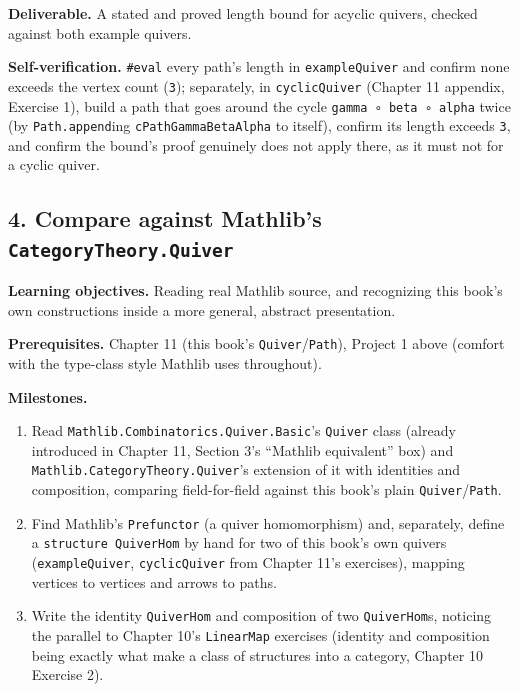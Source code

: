 \textbf{Deliverable.} A stated and proved length bound for acyclic quivers, checked against both example quivers.

\textbf{Self-verification.} \texttt{\#eval} every path's length in \texttt{exampleQuiver} and confirm none exceeds the vertex count (\texttt{3}); separately, in \texttt{cyclicQuiver} (Chapter 11 appendix, Exercise 1), build a path that goes around the cycle \texttt{gamma ∘ beta ∘ alpha} twice (by \texttt{Path.append}ing \texttt{cPathGammaBetaAlpha} to itself), confirm its length exceeds \texttt{3}, and confirm the bound's proof genuinely does not apply there, as it must not for a cyclic quiver.

\subsection{\texorpdfstring{4. Compare against Mathlib's \texttt{CategoryTheory.Quiver}}{4. Compare against Mathlib's CategoryTheory.Quiver}}\label{sec:13-next-steps:03-next-projects:5}

\textbf{Learning objectives.} Reading real Mathlib source, and recognizing this book's own constructions inside a more general, abstract presentation.

\textbf{Prerequisites.} Chapter 11 (this book's \texttt{Quiver}/\texttt{Path}), Project 1 above (comfort with the type-class style Mathlib uses throughout).

\textbf{Milestones.}

\begin{enumerate}
\def\labelenumi{\arabic{enumi}.}
\tightlist
\item
  Read \texttt{Mathlib.Combinatorics.Quiver.Basic}'s \texttt{Quiver} class (already introduced in Chapter 11, Section 3's ``Mathlib equivalent'' box) and \texttt{Mathlib.CategoryTheory.Quiver}'s extension of it with identities and composition, comparing field-for-field against this book's plain \texttt{Quiver}/\texttt{Path}.
\item
  Find Mathlib's \texttt{Prefunctor} (a quiver homomorphism) and, separately, define a \texttt{structure QuiverHom} by hand for two of this book's own quivers (\texttt{exampleQuiver}, \texttt{cyclicQuiver} from Chapter 11's exercises), mapping vertices to vertices and arrows to paths.
\item
  Write the identity \texttt{QuiverHom} and composition of two \texttt{QuiverHom}s, noticing the parallel to Chapter 10's \texttt{LinearMap} exercises (identity and composition being exactly what make a class of structures into a category, Chapter 10 Exercise 2).
\end{enumerate}

